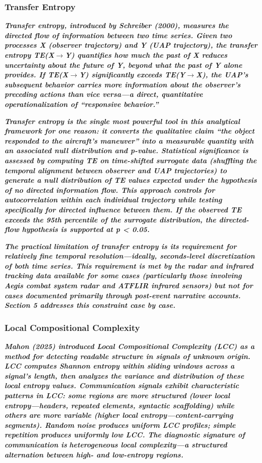 \documentclass[11pt,letterpaper]{article}
\begin{document}
\subsubsection{Transfer Entropy}

\textbf{\textit{Transfer entropy, introduced by Schreiber (2000), measures the directed flow of information between two time series. Given two processes X (observer trajectory) and Y (UAP trajectory), the transfer entropy TE(X$\rightarrow$Y) quantifies how much the past of X reduces uncertainty about the future of Y, beyond what the past of Y alone provides. If TE(X$\rightarrow$Y) significantly exceeds TE(Y$\rightarrow$X), the UAP's subsequent behavior carries more information about the observer's preceding actions than vice versa---a direct, quantitative operationalization of ``responsive behavior.''}}


\textbf{\textit{Transfer entropy is the single most powerful tool in this analytical framework for one reason: it converts the qualitative claim ``the object responded to the aircraft's maneuver'' into a measurable quantity with an associated null distribution and p-value. Statistical significance is assessed by computing TE on time-shifted surrogate data (shuffling the temporal alignment between observer and UAP trajectories) to generate a null distribution of TE values expected under the hypothesis of no directed information flow. This approach controls for autocorrelation within each individual trajectory while testing specifically for directed influence between them. If the observed TE exceeds the 95th percentile of the surrogate distribution, the directed-flow hypothesis is supported at p < 0.05.}}


\textbf{\textit{The practical limitation of transfer entropy is its requirement for relatively fine temporal resolution---ideally, seconds-level discretization of both time series. This requirement is met by the radar and infrared tracking data available for some cases (particularly those involving Aegis combat system radar and ATFLIR infrared sensors) but not for cases documented primarily through post-event narrative accounts. Section 5 addresses this constraint case by case.}}


\subsubsection{Local Compositional Complexity}

\textbf{\textit{Mahon (2025) introduced Local Compositional Complexity (LCC) as a method for detecting readable structure in signals of unknown origin. LCC computes Shannon entropy within sliding windows across a signal's length, then analyzes the variance and distribution of these local entropy values. Communication signals exhibit characteristic patterns in LCC: some regions are more structured (lower local entropy---headers, repeated elements, syntactic scaffolding) while others are more variable (higher local entropy---content-carrying segments). Random noise produces uniform LCC profiles; simple repetition produces uniformly low LCC. The diagnostic signature of communication is }}\textbf{\textit{heterogeneous local complexity}}\textbf{\textit{---a structured alternation between high- and low-entropy regions.}}
\end{document}
